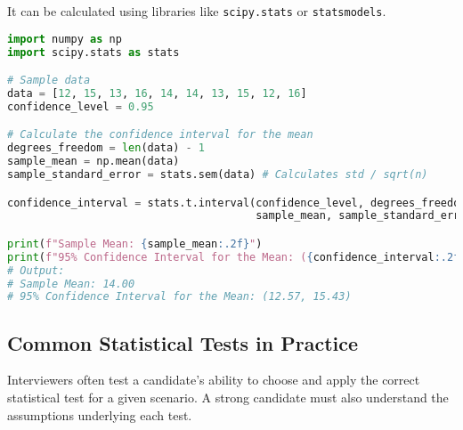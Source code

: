 \documentclass[11pt,a4paper]{article}
\begin{document}
It can be calculated using libraries like \texttt{scipy.stats} or \texttt{statsmodels}.

\begin{lstlisting}[language=Python]
import numpy as np
import scipy.stats as stats

# Sample data
data = [12, 15, 13, 16, 14, 14, 13, 15, 12, 16]
confidence_level = 0.95

# Calculate the confidence interval for the mean
degrees_freedom = len(data) - 1
sample_mean = np.mean(data)
sample_standard_error = stats.sem(data) # Calculates std / sqrt(n)

confidence_interval = stats.t.interval(confidence_level, degrees_freedom, 
                                       sample_mean, sample_standard_error)

print(f"Sample Mean: {sample_mean:.2f}")
print(f"95% Confidence Interval for the Mean: ({confidence_interval:.2f}, {confidence_interval[1]:.2f})")
# Output:
# Sample Mean: 14.00
# 95% Confidence Interval for the Mean: (12.57, 15.43)
\end{lstlisting}

\subsection{Common Statistical Tests in Practice}

Interviewers often test a candidate's ability to choose and apply the correct statistical test for a given scenario. A strong candidate must also understand the assumptions underlying each test.
\end{document}
